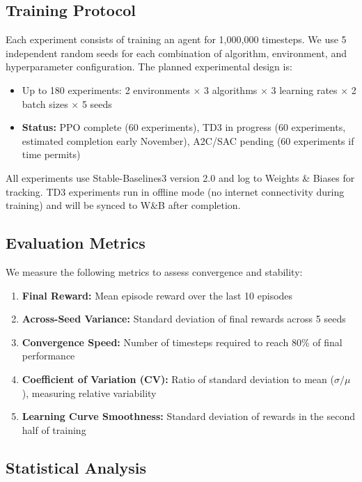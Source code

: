 \documentclass[12pt,a4paper]{report}
\begin{document}
\subsection{Training Protocol}

Each experiment consists of training an agent for 1,000,000 timesteps. We use 5 independent random seeds for each combination of algorithm, environment, and hyperparameter configuration. The planned experimental design is:

\begin{itemize}
    \item Up to 180 experiments: 2 environments $\times$ 3 algorithms $\times$ 3 learning rates $\times$ 2 batch sizes $\times$ 5 seeds
    \item \textbf{Status:} PPO complete (60 experiments), TD3 in progress (60 experiments, estimated completion early November), A2C/SAC pending (60 experiments if time permits)
\end{itemize}

All experiments use Stable-Baselines3 version 2.0 and log to Weights \& Biases for tracking. TD3 experiments run in offline mode (no internet connectivity during training) and will be synced to W\&B after completion.

\subsection{Evaluation Metrics}

We measure the following metrics to assess convergence and stability:

\begin{enumerate}
    \item \textbf{Final Reward:} Mean episode reward over the last 10 episodes
    \item \textbf{Across-Seed Variance:} Standard deviation of final rewards across 5 seeds
    \item \textbf{Convergence Speed:} Number of timesteps required to reach 80\% of final performance
    \item \textbf{Coefficient of Variation (CV):} Ratio of standard deviation to mean ($\sigma/\mu$), measuring relative variability
    \item \textbf{Learning Curve Smoothness:} Standard deviation of rewards in the second half of training
\end{enumerate}

\subsection{Statistical Analysis}
\end{document}
